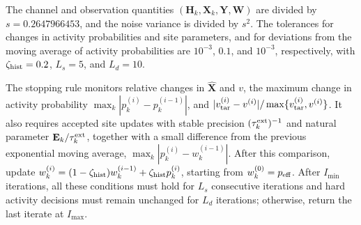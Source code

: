 The channel and observation quantities
$(\mathbf H_k,\mathbf X_k,\mathbf Y,\mathbf W)$ are divided by
$s=0.2647966453$, and the noise variance is divided by $s^2$.
The tolerances for changes in activity probabilities and site parameters,
and for deviations from the moving average of activity probabilities
are $10^{-3}$, $0.1$, and $10^{-3}$, respectively, with
$\zeta_{\rm hist}=0.2$, $L_s=5$, and $L_d=10$.

The stopping rule monitors relative changes in $\widehat{\mathbf X}$ and $v$,
the maximum change in activity probability $\max_k|p_k^{(i)}-p_k^{(i-1)}|$, and
$|v_{\rm tar}^{(i)}-v^{(i)}|/
\max\{v_{\rm tar}^{(i)},v^{(i)}\}$.
It also requires accepted site updates with stable precision
$(\tau_k^{\rm ext})^{-1}$ and natural parameter $\mathbf E_k/\tau_k^{\rm ext}$, together with a small difference from the previous exponential moving average, $\max_k|p_k^{(i)}-w_k^{(i-1)}|$.
After this comparison, update
$w_k^{(i)}=(1-\zeta_{\rm hist})w_k^{(i-1)}+\zeta_{\rm hist} p_k^{(i)}$, starting from
$w_k^{(0)}=p_{\rm eff}$.
After $I_{\min}$ iterations, all these conditions must hold for $L_s$
consecutive iterations and hard activity decisions must remain unchanged
for $L_d$ iterations; otherwise, return the last iterate at $I_{\max}$.

